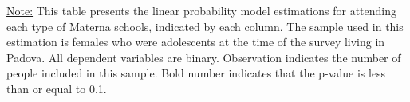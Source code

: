 \begin{footnotesize}
\noindent\underline{Note:} This table presents the linear probability model estimations for attending each type of Materna schools, indicated by each column. The sample used in this estimation is females who were adolescents at the time of the survey living in Padova. All dependent variables are binary. Observation indicates the number of people included in this sample. Bold number indicates that the p-value is less than or equal to 0.1.
\end{footnotesize}
